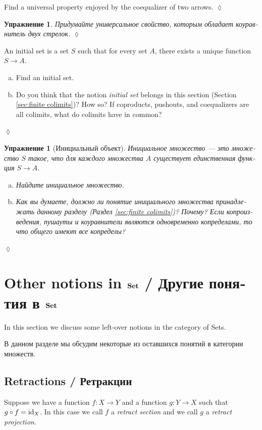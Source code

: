 \documentclass[a4paper]{book}
\def\tn{\textnormal}
\def\to{\rightarrow}
\def\taking{\colon}
\def\id{\tn{id}}
\def\Set{{\bf Set}}
\theoremstyle{myth}
\newtheorem{excENG}[envENG]{\begin{english}Exercise\end{english}}
\newtheorem{definitionENG}[envENG]{\begin{english}Definition\end{english}}
\newenvironment{exerciseENG}{\begin{excENG}}{\hspace*{\fill}$\lozenge$\end{excENG}}
\newtheorem{excRUS}[envRUS]{Упражнение}
\newenvironment{exerciseRUS}{\begin{excRUS}}{\hspace*{\fill}$\lozenge$\end{excRUS}}
\def\sexc{\begin{enumerate}[a.)]\setlength{\itemsep}{.1cm}\setlength{\parskip}{.1cm}\item}
\def\next{\item}
\def\endsexc{\end{enumerate}}
\begin{document}
\begin{russian}
\begin{exerciseENG}
Find a universal property enjoyed by the coequalizer of two arrows.
\end{exerciseENG}

\begin{exerciseRUS}
Придумайте универсальное свойство, которым обладает коуравнитель двух стрелок.
\end{exerciseRUS}

\begin{exerciseENG}[Initial object]\label{exc:initial set}
An initial set is a set $S$ such that for every set $A$, there exists a unique function $S\to A$. 
\sexc Find an initial set. 
\next Do you think that the notion {\em initial set} belongs in this section (Section \ref{sec:finite colimits})? How so? If coproducts, pushouts, and coequalizers are all colimits, what do colimits have in common?
\endsexc
\end{exerciseENG}

\begin{exerciseRUS}[Инициальный объект]\label{exc:initial set}
Инициальное множество — это множество $S$ такое, что для каждого множества $A$ существует единственная функция $S\to A$. 
\sexc Найдите инициальное множество. 
\next Как вы думаете, должно ли понятие {\em инициального множества} принадлежать данному разделу (Раздел \ref{sec:finite colimits})? Почему? Если копроизведения, пушауты и коуравнители являются одновременно копределами, то что общего имеют все копределы?
\endsexc
\end{exerciseRUS}


\section{Other notions in $\Set$ / Другие понятия в $\Set$}

In this section we discuss some left-over notions in the category of Sets.

В данном разделе мы обсудим некоторые из оставшихся понятий в категории множеств. 


\subsection{Retractions / Ретракции}

\begin{definitionENG}
Suppose we have a function $f\taking X\to Y$ and a function $g\taking Y\to X$ such that $g\circ f=\id_X$. In this case we call $f$ a {\em retract section} and we call $g$ a {\em retract projection}. 
\end{definitionENG}


\end{russian}
\end{document}
